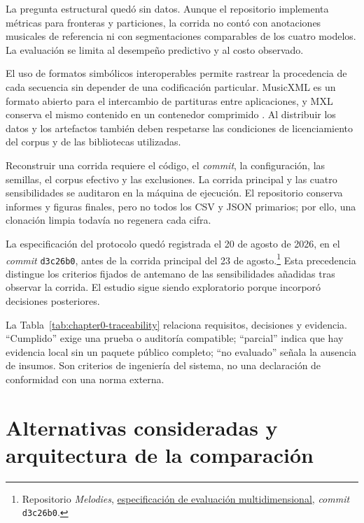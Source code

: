 La pregunta estructural quedó sin datos. Aunque el repositorio implementa métricas para fronteras y particiones, la corrida no contó con anotaciones musicales de referencia ni con segmentaciones comparables de los cuatro modelos. La evaluación se limita al desempeño predictivo y al costo observado.

El uso de formatos simbólicos interoperables permite rastrear la procedencia de cada secuencia sin depender de una codificación particular. MusicXML es un formato abierto para el intercambio de partituras entre aplicaciones, y MXL conserva el mismo contenido en un contenedor comprimido \cite{musicxml2021}. Al distribuir los datos y los artefactos también deben respetarse las condiciones de licenciamiento del corpus y de las bibliotecas utilizadas.

Reconstruir una corrida requiere el código, el \emph{commit}, la configuración, las semillas, el corpus efectivo y las exclusiones. La corrida principal y las cuatro sensibilidades se auditaron en la máquina de ejecución. El repositorio conserva informes y figuras finales, pero no todos los CSV y JSON primarios; por ello, una clonación limpia todavía no regenera cada cifra.

La especificación del protocolo quedó registrada el 20 de agosto de 2026, en el \emph{commit} \texttt{d3c26b0}, antes de la corrida principal del 23 de agosto.\footnote{Repositorio \emph{Melodies}, \href{https://github.com/JanusAdamus/Melodies/blob/d3c26b0ab563d8430f1c01b03695651b7bd1000b/docs/superpowers/specs/2026-08-20-multidimensional-evaluation-design.md}{especificación de evaluación multidimensional}, \emph{commit} \texttt{d3c26b0}.} Esta precedencia distingue los criterios fijados de antemano de las sensibilidades añadidas tras observar la corrida. El estudio sigue siendo exploratorio porque incorporó decisiones posteriores.

La Tabla~\ref{tab:chapter0-traceability} relaciona requisitos, decisiones y evidencia. ``Cumplido'' exige una prueba o auditoría compatible; ``parcial'' indica que hay evidencia local sin un paquete público completo; ``no evaluado'' señala la ausencia de insumos. Son criterios de ingeniería del sistema, no una declaración de conformidad con una norma externa.


\FloatBarrier

\section{Alternativas consideradas y arquitectura de la comparación}

